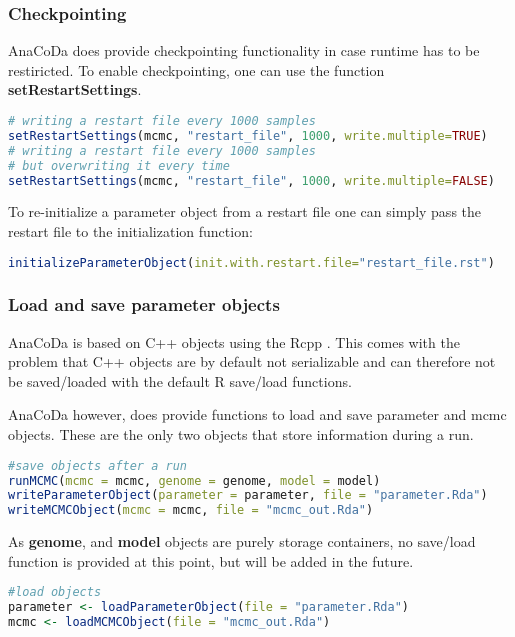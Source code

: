 \subsubsection{Checkpointing}

AnaCoDa does provide checkpointing functionality in case runtime has to be restiricted. 
To enable checkpointing, one can use the function \textbf{setRestartSettings}.

\begin{lstlisting}[language=R]
# writing a restart file every 1000 samples
setRestartSettings(mcmc, "restart_file", 1000, write.multiple=TRUE)
# writing a restart file every 1000 samples 
# but overwriting it every time
setRestartSettings(mcmc, "restart_file", 1000, write.multiple=FALSE)
\end{lstlisting}

To re-initialize a parameter object from a restart file one can simply pass the restart file to the initialization function:

\begin{lstlisting}[language=R]
initializeParameterObject(init.with.restart.file="restart_file.rst")
\end{lstlisting}

\subsubsection{Load and save parameter objects}
AnaCoDa is based on C++ objects using the Rcpp \citep{rcpp_package}. 
This comes with the problem that C++ objects are by default not serializable and can therefore not be saved/loaded with the default R save/load functions.

AnaCoDa however, does provide functions to load and save parameter and mcmc objects. 
These are the only two objects that store information during a run.

\begin{lstlisting}[language=R]
#save objects after a run
runMCMC(mcmc = mcmc, genome = genome, model = model)
writeParameterObject(parameter = parameter, file = "parameter.Rda")
writeMCMCObject(mcmc = mcmc, file = "mcmc_out.Rda")
\end{lstlisting}

As \textbf{genome}, and \textbf{model} objects are purely storage containers, no save/load function is provided at this point, but will be added in the future.

\begin{lstlisting}[language=R]
#load objects
parameter <- loadParameterObject(file = "parameter.Rda")
mcmc <- loadMCMCObject(file = "mcmc_out.Rda")
\end{lstlisting}

